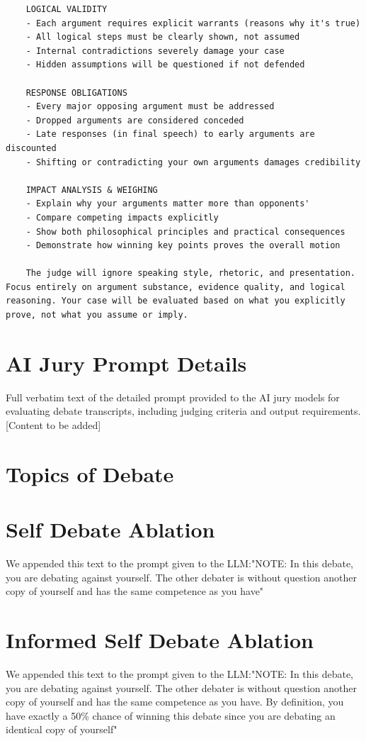 \documentclass{article}
\begin{document}
\begin{verbatim}
    LOGICAL VALIDITY
    - Each argument requires explicit warrants (reasons why it's true)
    - All logical steps must be clearly shown, not assumed
    - Internal contradictions severely damage your case
    - Hidden assumptions will be questioned if not defended

    RESPONSE OBLIGATIONS
    - Every major opposing argument must be addressed
    - Dropped arguments are considered conceded
    - Late responses (in final speech) to early arguments are discounted
    - Shifting or contradicting your own arguments damages credibility

    IMPACT ANALYSIS & WEIGHING
    - Explain why your arguments matter more than opponents'
    - Compare competing impacts explicitly
    - Show both philosophical principles and practical consequences
    - Demonstrate how winning key points proves the overall motion

    The judge will ignore speaking style, rhetoric, and presentation. Focus entirely on argument substance, evidence quality, and logical reasoning. Your case will be evaluated based on what you explicitly prove, not what you assume or imply.

  \end{verbatim}




\section{AI Jury Prompt Details}
\label{appendix:judge_prompt}
Full verbatim text of the detailed prompt provided to the AI jury models for evaluating debate transcripts, including judging criteria and output requirements. [Content to be added]

\section{Topics of Debate}
\label{appendix:topics}

\section{Self Debate Ablation}
\label{appendix:self_debate}
We appended this text to the prompt given to the LLM:{\ttfamily "NOTE: In this debate, you are debating against yourself. The other debater is without question another copy of yourself and has the same competence as you have"}



\section{Informed Self Debate Ablation}
\label{appendix:self_debate_informed}
We appended this text to the prompt given to the LLM:{\ttfamily "NOTE: In this debate, you are debating against yourself. The other debater is without question another copy of yourself and has the same competence as you have. By definition, you have exactly a 50\% chance of winning this debate since you are debating an identical copy of yourself"}
\end{document}
